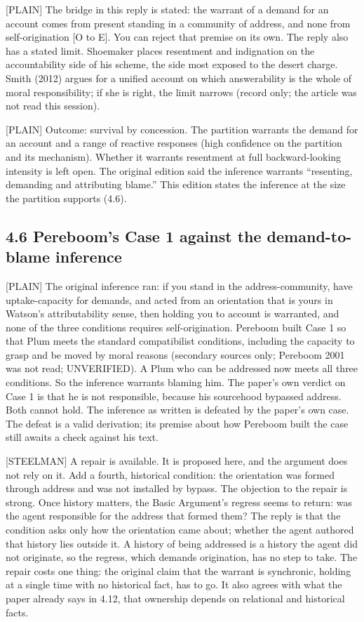 \documentclass[11pt]{article}
\newcommand{\register}[1]{{\ttfamily\small #1}}
\begin{document}
\register{[PLAIN]} The bridge in this reply is stated: the warrant of a demand for an account comes from present standing in a community of address, and none from self-origination [O to E]. You can reject that premise on its own. The reply also has a stated limit. Shoemaker places resentment and indignation on the accountability side of his scheme, the side most exposed to the desert charge. Smith (2012) argues for a unified account on which answerability is the whole of moral responsibility; if she is right, the limit narrows (record only; the article was not read this session).

\register{[PLAIN]} Outcome: survival by concession. The partition warrants the demand for an account and a range of reactive responses (high confidence on the partition and its mechanism). Whether it warrants resentment at full backward-looking intensity is left open. The original edition said the inference warrants ``resenting, demanding and attributing blame.'' This edition states the inference at the size the partition supports (4.6).

\subsection*{4.6 Pereboom's Case 1 against the demand-to-blame inference}

\register{[PLAIN]} The original inference ran: if you stand in the address-community, have uptake-capacity for demands, and acted from an orientation that is yours in Watson's attributability sense, then holding you to account is warranted, and none of the three conditions requires self-origination. Pereboom built Case 1 so that Plum meets the standard compatibilist conditions, including the capacity to grasp and be moved by moral reasons (secondary sources only; Pereboom 2001 was not read; UNVERIFIED). A Plum who can be addressed now meets all three conditions. So the inference warrants blaming him. The paper's own verdict on Case 1 is that he is not responsible, because his sourcehood bypassed address. Both cannot hold. The inference as written is defeated by the paper's own case. The defeat is a valid derivation; its premise about how Pereboom built the case still awaits a check against his text.

\register{[STEELMAN]} A repair is available. It is proposed here, and the argument does not rely on it. Add a fourth, historical condition: the orientation was formed through address and was not installed by bypass. The objection to the repair is strong. Once history matters, the Basic Argument's regress seems to return: was the agent responsible for the address that formed them? The reply is that the condition asks only how the orientation came about; whether the agent authored that history lies outside it. A history of being addressed is a history the agent did not originate, so the regress, which demands origination, has no step to take. The repair costs one thing: the original claim that the warrant is synchronic, holding at a single time with no historical fact, has to go. It also agrees with what the paper already says in 4.12, that ownership depends on relational and historical facts.
\end{document}
